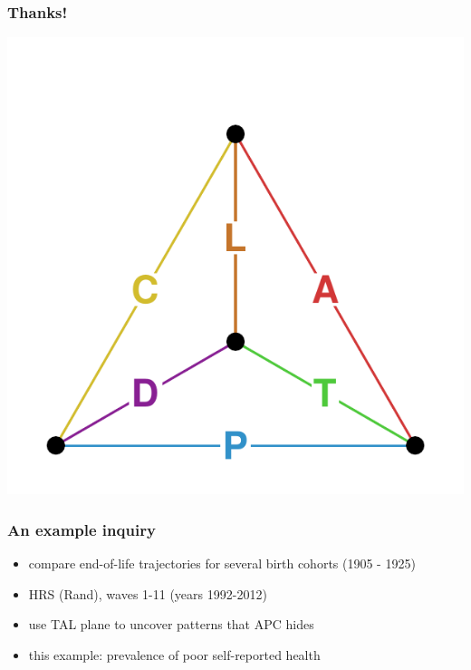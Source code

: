 \documentclass[20pt]{beamer}
\begin{document}


\begin{frame}
\frametitle{Thanks!}
\vspace{-4em}
\begin{center}
\includegraphics[scale=1.7]{Figures/TetraHedronEdgesOnly.pdf}
\end{center}
\end{frame}

\begin{frame}
\frametitle{An example inquiry}
\normalsize
\begin{itemize}[<+->]
  \item compare end-of-life trajectories for several birth cohorts (1905 - 1925)
  \item HRS (Rand), waves 1-11 (years 1992-2012)
  \item use TAL plane to uncover patterns that APC hides
  \item this example: prevalence of poor self-reported health
\end{itemize}
\end{frame}
\end{document}
